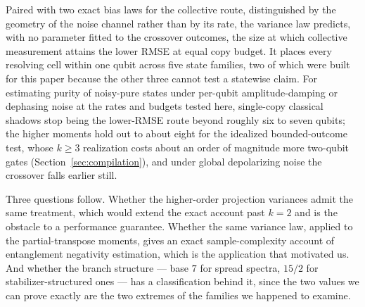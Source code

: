 Paired with two exact bias laws for the collective route, distinguished by the geometry of the
noise channel rather than by its rate, the variance law predicts, with no parameter fitted to the
crossover outcomes, the size at which collective measurement attains the lower RMSE at equal copy
budget. It places every resolving cell within one qubit across five state families, two of which
were built for this paper because the other three cannot test a statewise claim. For estimating
purity of noisy-pure states under per-qubit amplitude-damping or dephasing noise at the rates and
budgets tested here, single-copy classical shadows stop being the lower-RMSE route beyond roughly
six to seven qubits; the higher moments hold out to about eight for the idealized bounded-outcome
test, whose \(k \ge 3\) realization costs about an order of magnitude more two-qubit gates
(Section~\ref{sec:compilation}), and under global depolarizing noise the crossover falls earlier
still.

Three questions follow. Whether the higher-order projection variances admit the same treatment,
which would extend the exact account past \(k = 2\) and is the obstacle to a performance
guarantee. Whether the same variance law, applied to the partial-transpose moments, gives an exact
sample-complexity account of entanglement negativity estimation, which is the application that
motivated us. And whether the branch structure --- base \(7\) for spread spectra, \(15/2\) for
stabilizer-structured ones --- has a classification behind it, since the two values we can prove
exactly are the two extremes of the families we happened to examine.
